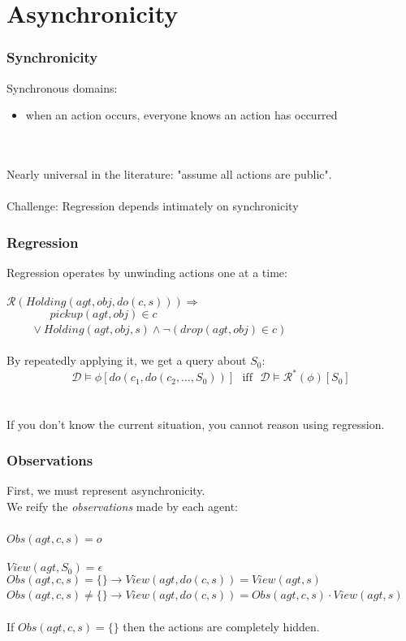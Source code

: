 \documentclass{beamer}
\newcommand{\Dt}{\mathcal{D}}
\newcommand{\Reg}{\mathcal{R}}
\begin{document}
\section{Asynchronicity}

\begin{frame}
\frametitle{Synchronicity}
Synchronous domains:
\begin{itemize}
\item when an action occurs, everyone knows an action has occurred
\end{itemize}
\ \\
\ \\
Nearly universal in the literature: "assume all actions are public".
\ \\
\ \\
\pause
\alert{Challenge:}  Regression depends intimately on synchronicity

\end{frame}

\begin{frame}
\frametitle{Regression}
Regression operates by unwinding actions one at a time:
\ \\
\ \\
$\Reg(Holding(agt,obj,do(c,s))) \Rightarrow$\\
$\,\,\,\,\,\,\,\,\,\,\,\,\,\,\,\,\,\,\,\,\,\,\,pickup(agt,obj) \in c$ \\
$\,\,\,\,\,\,\,\,\,\,\,\,\,\vee Holding(agt,obj,s) \wedge \neg\left(drop(agt,obj) \in c\right)$
\ \\
\ \\
\pause
By repeatedly applying it, we get a query about $S_0$:
\[
\Dt\models\phi[do(c_1,do(c_2,\dots,S_0))]\,\,\,\,\mathrm{iff}\,\,\,\,\Dt\models\Reg^{*}(\phi)[S_0]
\]
\ \\
\ \\
\pause
If you don't know the current situation, you cannot reason using regression.
\end{frame}

\begin{frame}
\frametitle{Observations}
First, we must represent asynchronicity.\\
We reify the \emph{observations} made by each agent:
\ \\
\ \\
\small
$Obs(agt,c,s) = o$
\ \\
\ \\
$View(agt,S_0) = \epsilon$\\
$Obs(agt,c,s) = \{\} \rightarrow View(agt,do(c,s)) = View(agt,s)$\\
$Obs(agt,c,s) \neq \{\} \rightarrow View(agt,do(c,s)) = Obs(agt,c,s) \cdot View(agt,s)$
\normalsize
\ \\
\ \\
If $Obs(agt,c,s)=\{\}$ then the actions are completely hidden.
\end{frame}
\end{document}
